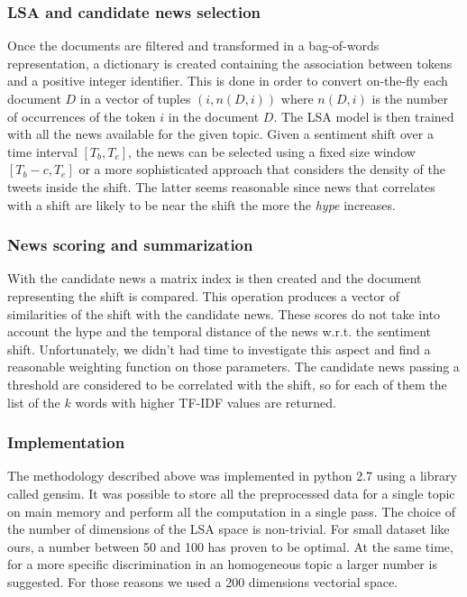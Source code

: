\subsubsection*{LSA and candidate news selection}
Once the documents are filtered and transformed in a bag-of-words representation, a dictionary is created containing the association between tokens and a positive integer identifier. This is done in order to convert on-the-fly each document $D$ in a vector of tuples $(i,n(D,i))$ where $n(D,i)$ is the number of occurrences of the token $i$ in the document $D$. The LSA model is then trained with all the news available for the given topic. Given a sentiment shift over a time interval $[T_b,T_e]$, the news can be selected using a fixed size window $[T_b - c,T_e]$ or a more sophisticated approach that considers the density of the tweets inside the shift. The latter seems reasonable since news that correlates with a shift are likely to be near the shift the more the \emph{hype} increases.

\subsubsection*{News scoring and summarization}
With the candidate news a matrix index is then created and the document representing the shift is compared. This operation produces a vector of similarities of the shift with the candidate news. These scores do not take into account the hype and the temporal distance of the news w.r.t. the sentiment shift. Unfortunately, we didn't had time to investigate this aspect and find a reasonable weighting function on those parameters. The candidate news passing a threshold are considered to be correlated with the shift, so for each of them the list of the $k$ words with higher TF-IDF values are returned.

\subsubsection*{Implementation}
The methodology described above was implemented in python 2.7 using a library called gensim\cite{Gensim}. It was possible to store all the preprocessed data for a single topic on main memory and perform all the computation in a single pass. The choice of the number of dimensions of the LSA space is non-trivial. For small dataset like ours, a number between 50 and 100 has proven to be optimal\cite{LSA2}. At the same time, for a more specific discrimination in an homogeneous topic a larger number is suggested. For those reasons we used a 200 dimensions vectorial space.